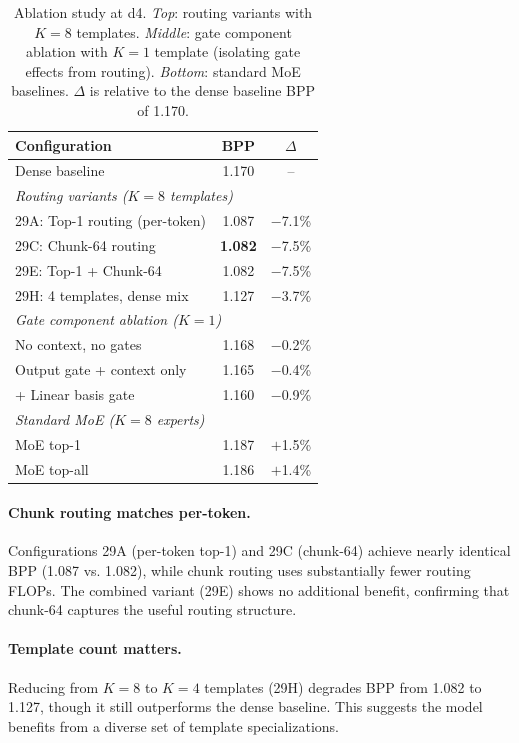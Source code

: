 \documentclass{article}
\begin{document}
\begin{table}[t]
\centering
\small
\caption{Ablation study at d4. \emph{Top}: routing variants with $K{=}8$ templates. \emph{Middle}: gate component ablation with $K{=}1$ template (isolating gate effects from routing). \emph{Bottom}: standard MoE baselines. $\Delta$ is relative to the dense baseline BPP of 1.170.}
\label{tab:ablation}
\begin{tabular}{@{}lcc@{}}
\toprule
\textbf{Configuration} & \textbf{BPP} & \textbf{$\Delta$} \\
\midrule
Dense baseline & 1.170 & -- \\
\midrule
\multicolumn{3}{l}{\textit{Routing variants ($K{=}8$ templates)}} \\
\quad 29A: Top-1 routing (per-token) & 1.087 & $-$7.1\% \\
\quad 29C: Chunk-64 routing & \textbf{1.082} & $-$7.5\% \\
\quad 29E: Top-1 + Chunk-64 & 1.082 & $-$7.5\% \\
\quad 29H: 4 templates, dense mix & 1.127 & $-$3.7\% \\
\midrule
\multicolumn{3}{l}{\textit{Gate component ablation ($K{=}1$)}} \\
\quad No context, no gates & 1.168 & $-$0.2\% \\
\quad Output gate + context only & 1.165 & $-$0.4\% \\
\quad + Linear basis gate & 1.160 & $-$0.9\% \\
\midrule
\multicolumn{3}{l}{\textit{Standard MoE ($K{=}8$ experts)}} \\
\quad MoE top-1 & 1.187 & $+$1.5\% \\
\quad MoE top-all & 1.186 & $+$1.4\% \\
\bottomrule
\end{tabular}
\end{table}

\paragraph{Chunk routing matches per-token.} Configurations 29A (per-token top-1) and 29C (chunk-64) achieve nearly identical BPP (1.087 vs. 1.082), while chunk routing uses substantially fewer routing FLOPs. The combined variant (29E) shows no additional benefit, confirming that chunk-64 captures the useful routing structure.

\paragraph{Template count matters.} Reducing from $K{=}8$ to $K{=}4$ templates (29H) degrades BPP from 1.082 to 1.127, though it still outperforms the dense baseline. This suggests the model benefits from a diverse set of template specializations.
\end{document}
